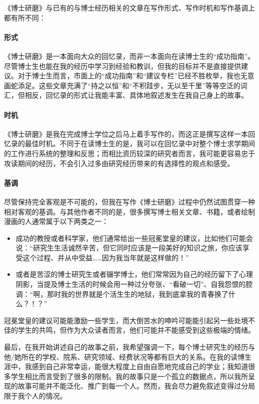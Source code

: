 \documentclass[12pt,UTF8,nofonts]{book}
\newcommand{\bookname}{博士研磨}
\begin{document}
《\bookname》与已有的与博士经历相关的文章在写作形式、写作时机和写作基调上都有所不同：

\paragraph{形式} 《\bookname》是一本面向大众的回忆录，而非一本面向在读博士生的“成功指南”。尽管博士生也能在我的经历中学习到经验和教训，但我的目标并不是直接提供建议。对于博士生而言，市面上的“成功指南”和“建议专栏”已经不胜枚举，我也无意画蛇添足。这些文章充满了“持之以恒”和“不积跬步，无以至千里”等等空泛的词汇，但相反，回忆录的形式让我能丰富、具体地叙述发生在我自己身上的故事。

\paragraph{时机} 《\bookname》是我在完成博士学位之后马上着手写作的，而这正是撰写这样一本回忆录的最佳时机。不同于在读博士生的是，我可以在回忆录中对整个博士求学期间的工作进行系统的整理和反思；而相比资历较深的研究者而言，我可能更容易忠于攻读期间的经历，不会引入过多由研究经历带来的有选择性的观点和感受。


\paragraph{基调} 尽管保持完全客观是不可能的，但我在写作《\bookname》过程中仍然试图贯穿一种相对客观的基调。与其他作者不同的是，很多撰写博士相关文章、书籍，或者绘制漫画的人通常属于以下两类之一：
\begin{itemize}
\item 成功的教授或者科学家，他们通常给出一些冠冕堂皇的建议，比如他们可能会说：“研究生生活诚然辛苦，但它同时应该是一段美好的知识之旅，你应该享受这个过程、并从中受益……因为我当年就是这样做的！”
\item 或者是苦涩的博士研究生或者辍学博士，他们常常因为自己的经历留下了心理阴影，当提及博士生活的时候会用一种过分夸张、“看破一切”、自我怨恨的腔调：“啊，那时我的世界就是个活生生的地狱，我到底拿我的青春换了什么？！？”
\end{itemize}

冠冕堂皇的建议可能能激励一些学生，而大倒苦水的呻吟可能能引起另一些处境不佳的学生的共鸣，但作为大众读者而言，他们可能并不能感受到这些极端的情绪。

最后，在我开始讲述自己的故事之前，我希望强调一下，每个博士研究生的经历与他/她所在的学校、院系、研究领域、经费状况等都有巨大的关系。在我的读博生涯中，我感到自己非常幸运，能很大程度上自由自愿地完成自己的学业；我知道很多学生相比而言受到了很多的限制。我的故事只是一个孤立的数据点，所以我所呈现的故事可能并不能泛化、推广到每一个人。然而，我会尽力避免叙述变得过分局限于我个人的情况。
\end{document}
